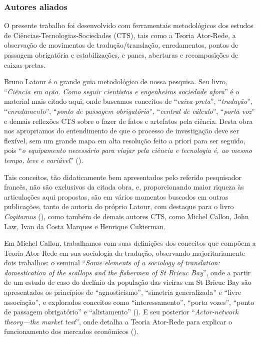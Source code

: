 \subsubsection{Autores aliados}

O presente trabalho foi desenvolvido com ferramentais metodológicos dos estudos de Ciências-Tecnologias-Sociedades (CTS), tais como a Teoria Ator-Rede, a observação de movimentos de tradução/translação, enredamentos, pontos de passagem obrigatória e estabilizações, e panes, aberturas e recomposições de caixas-pretas.

Bruno Latour é o grande guia metodológico de nossa pesquisa. Seu livro, ``\textit{Ciência em ação. Como seguir cientistas e engenheiros sociedade afora}'' é o material mais citado aqui, onde buscamos conceitos de ``\textit{caixa-preta}'', ``\textit{tradução}'', ``\textit{enredamento}'', ``\textit{ponto de passagem obrigatório}'', ``\textit{central de cálculo}'', ``\textit{porta voz}'' e demais reflexões CTS sobre o fazer de fatos e artefatos pela ciência. Desta obra nos apropriamos do entendimento de que o processo de investigação deve ser flexível, sem um grande mapa em alta resolução feito a priori para ser seguido, pois ``\textit{o equipamento necessário para viajar pela ciência e tecnologia é, ao mesmo tempo, leve e variável}'' (\cite[p.10]{latour_ciencia_1987}).

Tais conceitos, tão didaticamente bem apresentados pelo referido pesquisador francês, não são exclusivos da citada obra, e, proporcionando maior riqueza às articulações aqui propostas, são em vários momentos buscados em outras publicações, tanto de autoria do próprio Latour, com destaque para o livro \textit{Cogitamus} (\cite{latour_cogitamus_2010}), como também de demais autores CTS, como Michel Callon, John Law, Ivan da Costa Marques e Henrique Cukierman.

Em Michel Callon, trabalhamos com suas definições dos conceitos que compõem a Teoria Ator-Rede em sua sociologia da tradução, observando majoritariamente dois trabalhos: o seminal ``\textit{Some elements of a sociology of translation: domestication of the scallops and the fishermen of St Brieuc Bay}'', onde a partir de um estudo de caso do declínio da população das vieiras em St Brieuc Bay são apresentados os princípios de ``agnosticismo'', ``simetria generalizada'' e ``livre associação'', e explorados conceitos como ``interessamento'', ``porta vozes'', ``ponto de passagem obrigatório'' e ``alistamento'' (\cite{callon_scallops_1986}). E seu posterior ``\textit{Actor-network theory—the market test}'', onde detalha a Teoria Ator-Rede para explicar o funcionamento dos mercados econômicos (\cite{callon_markets_1998}).

